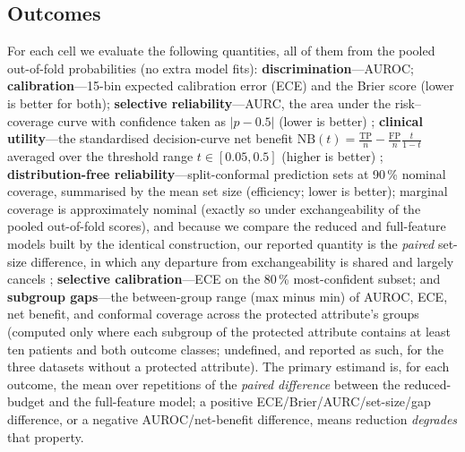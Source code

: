 \documentclass[fleqn,10pt]{wlscirep}
\begin{document}
\subsection{Outcomes}
For each cell we evaluate the following quantities, all of them from the pooled out-of-fold
probabilities (no extra model fits):
\textbf{discrimination}---AUROC; \textbf{calibration}---15-bin expected calibration error
(ECE) \cite{guo2017calibration} and the
Brier score \cite{brier1950verification} (lower is better for both); \textbf{selective
reliability}---AURC, the area under the
risk--coverage curve with confidence taken as $|p-0.5|$ (lower is
better) \cite{elyaniv2010foundations,geifman2017selective}; \textbf{clinical
utility}---the standardised decision-curve net benefit $\mathrm{NB}(t)=\tfrac{\mathrm{TP}}{n}-\tfrac{\mathrm{FP}}{n}\tfrac{t}{1-t}$
averaged over the threshold range $t\in[0.05,0.5]$ (higher is better) \cite{vickers2006decision};
\textbf{distribution-free reliability}---split-conformal prediction sets at 90\,\% nominal coverage,
summarised by the mean set size (efficiency; lower is better); marginal coverage is approximately
nominal (exactly so under exchangeability of the pooled out-of-fold scores), and because we compare the
reduced and full-feature models built by the identical construction, our reported quantity is the
\emph{paired} set-size difference, in which any departure from exchangeability is shared and largely
cancels \cite{romano2020classification,angelopoulos2023conformal};
\textbf{selective calibration}---ECE on the 80\,\% most-confident subset; and \textbf{subgroup
gaps}---the between-group range (max minus min) of AUROC, ECE, net benefit, and conformal coverage
across the protected attribute's groups (computed only where each subgroup of the protected
attribute contains at least ten patients and both outcome classes; undefined, and reported as such,
for the three datasets without a protected attribute). The primary estimand is, for each outcome, the
mean over repetitions of the \emph{paired difference} between the reduced-budget and the
full-feature model; a positive ECE/Brier/AURC/set-size/gap difference, or a negative
AUROC/net-benefit difference, means reduction \emph{degrades} that property.
\end{document}
